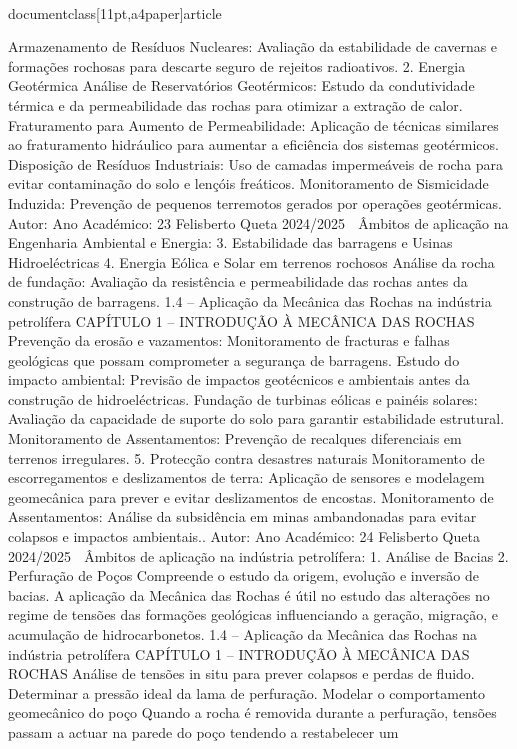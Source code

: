 \\documentclass[11pt,a4paper]{article}
\begin{document}
Armazenamento de Resíduos Nucleares:
Avaliação da estabilidade de cavernas e formações rochosas para descarte seguro de rejeitos radioativos.
2. Energia Geotérmica
Análise de Reservatórios Geotérmicos:
Estudo da condutividade térmica e da permeabilidade das rochas para otimizar a extração de calor.
Fraturamento para Aumento de Permeabilidade:
Aplicação de técnicas similares ao fraturamento hidráulico para aumentar a eficiência dos sistemas geotérmicos.
Disposição de Resíduos Industriais:
Uso de camadas impermeáveis de rocha para evitar contaminação do solo e lençóis freáticos.
Monitoramento de Sismicidade Induzida:
Prevenção de pequenos terremotos gerados por operações geotérmicas.
Autor:
Ano Académico:
23
Felisberto Queta
2024/2025

 Âmbitos de aplicação 
na Engenharia Ambiental e Energia:
3. Estabilidade das barragens e Usinas Hidroeléctricas
4. Energia Eólica e Solar em terrenos rochosos
Análise da rocha de fundação:
Avaliação da resistência e permeabilidade das rochas antes da construção de barragens.
1.4 – Aplicação da Mecânica das Rochas na indústria petrolífera
CAPÍTULO 1 
–
 INTRODUÇÃO À MECÂNICA DAS ROCHAS
Prevenção da erosão e vazamentos:
Monitoramento de fracturas e falhas geológicas que possam comprometer a segurança de barragens.
Estudo do impacto ambiental:
Previsão de impactos geotécnicos e ambientais antes da construção de hidroeléctricas.
Fundação de turbinas eólicas e painéis solares:
Avaliação da capacidade de suporte do solo para garantir estabilidade estrutural.
Monitoramento de Assentamentos:
Prevenção de recalques diferenciais em terrenos irregulares.
5. Protecção contra desastres naturais
Monitoramento de escorregamentos e deslizamentos de terra:
Aplicação de sensores e modelagem geomecânica para prever e evitar deslizamentos de encostas.
Monitoramento de Assentamentos:
Análise da subsidência em minas ambandonadas para evitar colapsos e impactos ambientais..
Autor:
Ano Académico:
24
Felisberto Queta
2024/2025

 Âmbitos de aplicação na indústria petrolífera:
1. Análise de Bacias
2. Perfuração de Poços
Compreende o estudo da origem, evolução e inversão de bacias. A aplicação da Mecânica das Rochas é útil no estudo das
alterações no regime de tensões das formações geológicas influenciando a geração, migração, e acumulação de
hidrocarbonetos.
1.4 – Aplicação da Mecânica das Rochas na indústria petrolífera
CAPÍTULO 1 
–
 INTRODUÇÃO À MECÂNICA DAS ROCHAS
Análise de tensões in situ para prever colapsos e perdas de fluido.
Determinar a pressão ideal da lama de perfuração.
Modelar o comportamento geomecânico do poço
Quando a rocha é removida durante a perfuração, tensões passam a actuar na parede do poço tendendo a restabelecer um 
\end{document}
